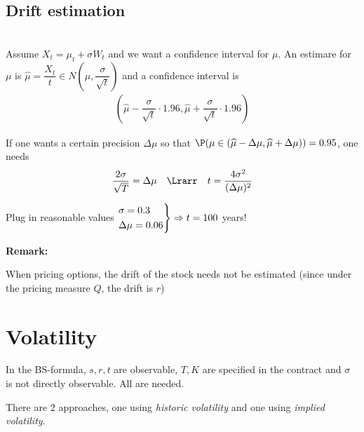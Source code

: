 \subsection{Drift estimation}\hfill\\
Assume $X_t = \mu_t+\sigma W_t$ and we want a confidence interval for $\mu$. An estimare for $\mu$ is $\widehat{\mu} = \dfrac{X_t}{t}\in N\left(\mu,\dfrac{\sigma}{\sqrt{t}}\right)$ and a confidence interval is
\begin{equation*}
  \begin{gathered}
    \left(\widehat{\mu}-\dfrac{\sigma}{\sqrt{t}}\cdot1.96, \widehat{\mu}+\dfrac{\sigma}{\sqrt{t}}\cdot1.96\right)
  \end{gathered}
\end{equation*}\par
\noindent If one wants a certain precision $\Delta \mu$ so that $\P(\mu\in(\widehat{\mu}-\Delta\mu,\widehat{\mu}+\Delta\mu)) = 0.95$, one needs
\begin{equation*}
  \begin{gathered}
    \dfrac{2\sigma}{\sqrt{T}} =\Delta\mu\quad\Lrarr\quad t = \dfrac{4\sigma^2}{(\Delta\mu)^2}
  \end{gathered}
\end{equation*}\par
\noindent Plug in reasonable values $\begin{rcases}
  \sigma = 0.3\\\Delta\mu = 0.06
\end{rcases}\Rightarrow t=100$ years!
\par\bigskip
\noindent\textbf{Remark:}\par
\noindent When pricing options, the drift of the stock needs not be estimated (since under the pricing measure $Q$, the drift is $r$)
\par\bigskip
\section{Volatility}
In the BS-formula, $s,r,t$ are observable, $T,K$ are specified in the contract and $\sigma$ is not directly observable. All are needed.\par
\noindent There are 2 approaches, one using \textit{historic volatility} and one using \textit{implied volatility}.
\par\bigskip
